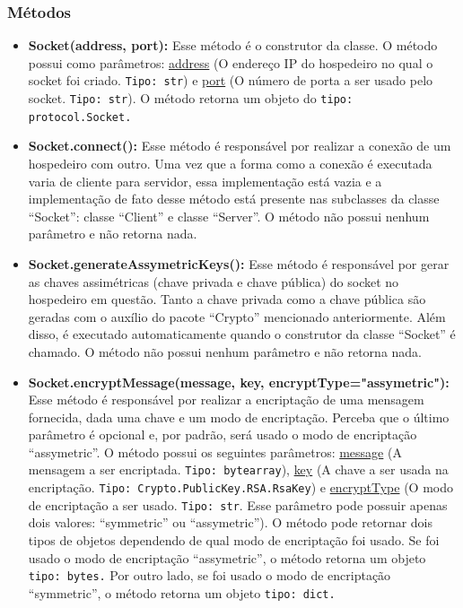 \documentclass[10pt]{article}
\begin{document}
\begin{itemize}
        \subsubsection{\large Métodos}
            \begin{itemize}
            \item \textbf{Socket(address, port):} Esse método é o construtor da classe. O método possui como parâmetros: \underline{address} (O endereço IP do hospedeiro no qual o socket foi criado. \texttt{Tipo: str}) e \underline{port} (O número de porta a ser usado pelo socket. \texttt{Tipo: str}). O método retorna um objeto do \texttt{tipo: protocol.Socket.}
            \item \textbf{Socket.connect():} Esse método é responsável por realizar a conexão de um hospedeiro
            com outro. Uma vez que a forma como a conexão é executada varia de cliente para servidor, essa implementação está vazia e a implementação de fato desse método está presente nas subclasses da classe “Socket”: classe “Client” e classe “Server”. O método não possui nenhum parâmetro e não retorna nada.
            \item \textbf{Socket.generateAssymetricKeys():} Esse método é responsável por gerar as chaves assimétricas (chave privada e chave pública) do socket no hospedeiro em questão. Tanto a chave privada como a chave pública são geradas com o auxílio do pacote “Crypto” mencionado anteriormente. Além disso, é executado automaticamente quando o construtor da classe “Socket” é chamado. O método não possui nenhum parâmetro e não retorna nada.
            \item \textbf{Socket.encryptMessage(message, key, encryptType="assymetric"):} Esse \newline método é responsável por realizar a encriptação de uma mensagem fornecida, dada uma chave e um modo de encriptação. Perceba que o último parâmetro é opcional e, por padrão, será usado o modo de encriptação “assymetric”. O método possui os seguintes parâmetros: \underline{message} (A mensagem a ser encriptada. \texttt{Tipo: bytearray}), \underline{key} (A chave a ser usada na encriptação. \texttt{Tipo: Crypto.PublicKey.RSA.RsaKey}) e \underline{encryptType} (O modo de encriptação a ser usado. \texttt{Tipo: str}. Esse parâmetro pode possuir apenas dois valores: “symmetric” ou “assymetric”). O método pode retornar dois tipos de objetos dependendo de qual modo de encriptação foi usado. Se foi usado o modo de encriptação “assymetric”, o método retorna um objeto \texttt{tipo: bytes.} Por outro lado, se foi usado o modo de encriptação “symmetric”, o método retorna um objeto \texttt{tipo: dict.}

\end{itemize}
\end{itemize}
\end{document}
